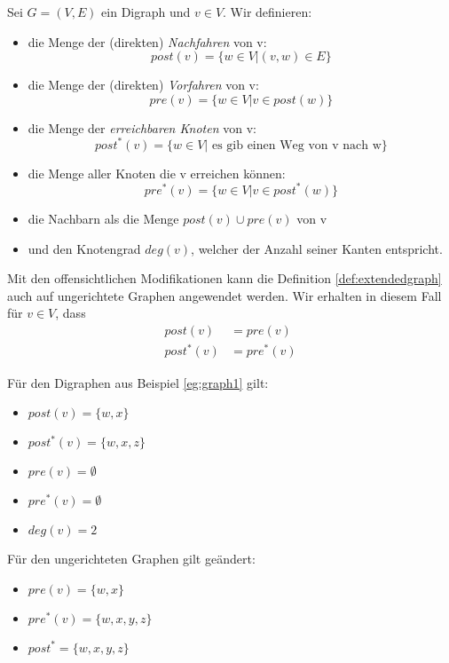\begin{definition}
	\label{def:extendedgraph}
Sei $G=(V,E)$ ein Digraph und $v \in V$. Wir definieren:
\begin{itemize}
	\item die Menge der (direkten) \emph{Nachfahren} von v:
		\[
	post(v)=\{w \in V | (v,w) \in E\} 
		\]
	\item die Menge der (direkten) \emph{Vorfahren} von v:
		\[
		pre(v) = \{w \in  V | v \in  post(w)\} 
		\]
	\item die Menge der \emph{erreichbaren Knoten} von v:
		\[
		post^*(v)=\{w \in V | \text{ es gib einen Weg von v nach w}\} 
		\]
	\item die Menge aller Knoten die v erreichen können:
		\[
		pre^*(v)= \{w \in  V | v \in  post^*(w) \} 
		\]
	\item die Nachbarn als die Menge $post(v) \cup pre(v)$ von v
	\item und den Knotengrad $deg(v)$, welcher der Anzahl seiner Kanten entspricht.
\end{itemize}
\end{definition}
\begin{remark}
Mit den offensichtlichen Modifikationen kann die Definition \ref{def:extendedgraph} auch auf ungerichtete Graphen angewendet werden. Wir erhalten in diesem Fall für $v \in V$, dass
\begin{align*}
	post(v)&=pre(v) \\
	post^*(v) &= pre^*(v)
\end{align*}
\end{remark}
\begin{example}
Für den Digraphen aus Beispiel \ref{eg:graph1} gilt:
\begin{itemize}
	\item $post(v) = \{w,x\}$
	\item $post^*(v) = \{w,x,z\}$
	\item $pre(v)= \emptyset$
	\item $pre^*(v)= \emptyset$
	\item $deg(v)=2$
\end{itemize}
Für den ungerichteten Graphen gilt geändert:
\begin{itemize}
	\item $pre(v)=\{w,x\}$
	\item $pre^*(v)=\{w,x,y,z\}$
	\item $post^* = \{w,x,y,z\}$
\end{itemize}
\end{example}
